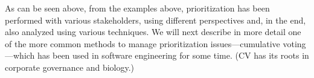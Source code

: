 As can be seen above, from the examples above, prioritization has been performed 
with various stakeholders, using different perspectives and, in the end, also analyzed using 
various techniques. We will next describe in more detail one of the more common methods to 
manage prioritization issues---cumulative voting---which has been used in software engineering 
for some time. (CV has its roots in corporate governance and biology.)